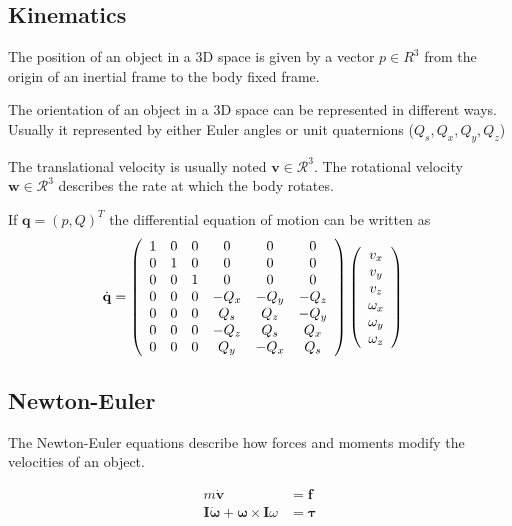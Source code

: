 \subsection{Kinematics}
The position of an object in a 3D space is given by a vector $p \in R^3$ from the origin of an inertial frame to the body fixed frame.

The orientation of an object in a 3D space can be represented in different ways. Usually it represented by either Euler angles or unit quaternions ($Q_s, Q_x, Q_y, Q_z$)

The translational velocity is usually noted $\mathbf{v} \in \mathcal{R}^3$. The rotational velocity $\mathbf{w} \in \mathcal{R}^3$ describes the rate at which the body rotates.

If $\mathbf{q} = (p, Q)^T$ the differential equation of motion can be written as 
\begin{align*}
\dot{\mathbf{q}} &= \left(\begin{array}{c c c c c c}
1 & 0 & 0 & 0 & 0 & 0\\
0 & 1 & 0 & 0 & 0 & 0\\
0 & 0 & 1 & 0 & 0 & 0\\
0 & 0 & 0 & -Q_x & -Q_y & -Q_z\\
0 & 0 & 0 & Q_s & Q_z & -Q_y\\
0 & 0 & 0 & -Q_z & Q_s & Q_x\\
0 & 0 & 0 & Q_y & -Q_x & Q_s
\end{array}\right)
\left(\begin{array}{c}
v_x\\
v_y\\
v_z\\
\omega_x\\
\omega_y\\
\omega_z
\end{array}\right)
\end{align*}

\subsection{Newton-Euler}
The Newton-Euler equations describe how forces and moments modify the velocities of an object.

\begin{align}
m\dot{\mathbf{v}} &= \mathbf{f} \label{eq:newton1}\\
\mathbf{I}\dot{\mathbf{\omega}} + \mathbf{\omega} \times \mathbf{I}\omega &= \mathbf{\tau}
\end{align}

